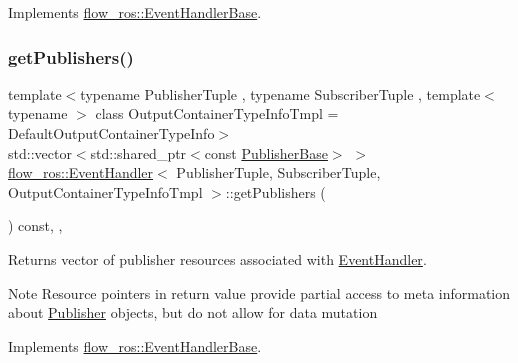 Implements \hyperlink{classflow__ros_1_1_event_handler_base_a85873d1e3eaa3c152295c5c49d5948f6}{flow\+\_\+ros\+::\+Event\+Handler\+Base}.

\mbox{\label{classflow__ros_1_1_event_handler_ae786846cf4cf48b9b952265862e73ef1}} 
\subsubsection{\texorpdfstring{get\+Publishers()}{getPublishers()}}
{\footnotesize\ttfamily template$<$typename Publisher\+Tuple , typename Subscriber\+Tuple , template$<$ typename $>$ class Output\+Container\+Type\+Info\+Tmpl = Default\+Output\+Container\+Type\+Info$>$ \\
std\+::vector$<$std\+::shared\+\_\+ptr$<$const \hyperlink{classflow__ros_1_1_publisher_base}{Publisher\+Base}$>$ $>$ \hyperlink{classflow__ros_1_1_event_handler}{flow\+\_\+ros\+::\+Event\+Handler}$<$ Publisher\+Tuple, Subscriber\+Tuple, Output\+Container\+Type\+Info\+Tmpl $>$\+::get\+Publishers (\begin{DoxyParamCaption}{ }\end{DoxyParamCaption}) const\hspace{0.3cm}{\ttfamily [inline]}, {\ttfamily [override]}, {\ttfamily [virtual]}}



Returns vector of publisher resources associated with \hyperlink{classflow__ros_1_1_event_handler}{Event\+Handler}. 

\begin{DoxyNote}{Note}
Resource pointers in return value provide partial access to meta information about \hyperlink{classflow__ros_1_1_publisher}{Publisher} objects, but do not allow for data mutation 
\end{DoxyNote}


Implements \hyperlink{classflow__ros_1_1_event_handler_base_a1e476ba767ddceda60aadc5655ef33ed}{flow\+\_\+ros\+::\+Event\+Handler\+Base}.

\mbox{\label{classflow__ros_1_1_event_handler_ac91cf67be38d79d3d86a9aa6318eca53}} 
